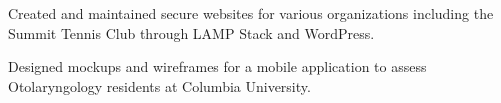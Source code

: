 \begin{cventries}
{\begin{cvitems}
             \vspace{1mm}
        \item {Created and maintained secure websites for various organizations including the Summit Tennis Club through LAMP Stack and WordPress.} 
             \vspace{1mm}
        \item {Designed mockups and wireframes for a mobile application to assess Otolaryngology residents at Columbia University.}
      \end{cvitems}
    }

    
\end{cventries}
